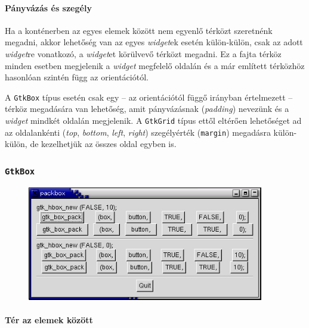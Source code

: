\paragraph{Pányvázás és szegély}

Ha a konténerben az egyes elemek között nem egyenlő térközt szeretnénk megadni, akkor lehetőség van az egyes \textit{widget}ek esetén külön-külön, csak az adott \textit{widget}re vonatkozó, a \textit{widget}et körülvevő térközt megadni. Ez a fajta térköz minden esetben megjelenik a \textit{widget} megfelelő oldalán és a már említett térközhöz hasonlóan szintén függ az orientációtól.

A \texttt{GtkBox} típus esetén csak egy -- az orientációtól függő irányban értelmezett -- térköz megadására van lehetőség, amit pányvázásnak (\textit{padding}) nevezünk és a \textit{widget} mindkét oldalán megjelenik. A \texttt{GtkGrid} típus ettől eltérően lehetőséget ad az oldalankénti (\textit{top}, \textit{bottom}, \textit{left}, \textit{right}) szegélyérték (\texttt{margin}) megadásra külön-külön, de kezelhetjük az összes oldal egyben is.

\subsubsection{\texttt{GtkBox}}

\vspace{12 pt}
\begin{figure}[H]
\begin{center}
\includegraphics[height=50mm]{images/packbox2.png}
\end{center}
\end{figure}

\paragraph{Tér az elemek között}

